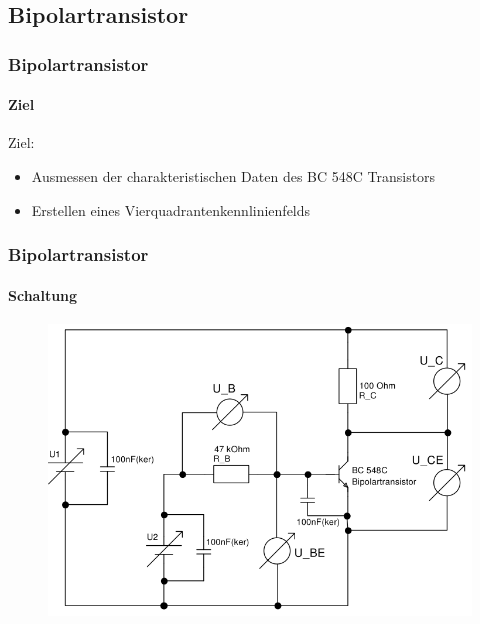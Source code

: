 \subsection{Bipolartransistor} %
\label{sub:Bipolartransistor}
\begin{frame}
    \frametitle{Bipolartransistor}
    \framesubtitle{Ziel}
    \begin{block}{Ziel:}
         \begin{itemize}
             \item Ausmessen der charakteristischen Daten des BC 548C
             Transistors
             \item Erstellen eines Vierquadrantenkennlinienfelds
         \end{itemize}
    \end{block}
\end{frame}
\begin{frame}
    \frametitle{Bipolartransistor}
    \framesubtitle{Schaltung}
    \begin{figure}[H]
    \begin{center}
            \includegraphics[scale=0.35]{./img/schaltungen/bipolarschaltung.png}
    \end{center}
    \end{figure}
\end{frame}

